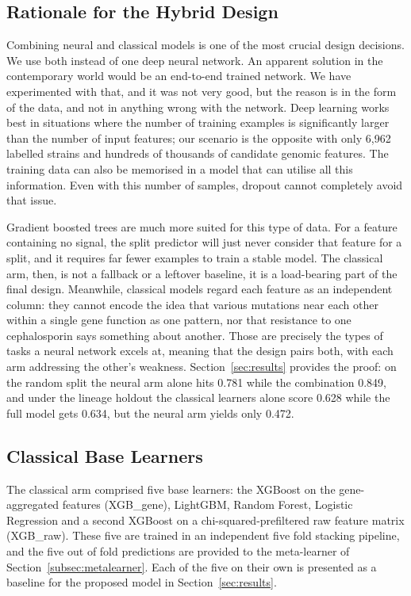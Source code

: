 \documentclass[journal]{IEEEtran}
\begin{document}
\subsection{Rationale for the Hybrid Design}
\label{subsec:hybrid}

Combining neural and classical models is one of the most crucial design decisions.
We use both instead of one deep neural network. An apparent solution in the
contemporary world would be an end-to-end trained network. We have experimented with
that, and it was not very good, but the reason is in the form of the data, and not
in anything wrong with the network. Deep learning works best in situations where the
number of training examples is significantly larger than the number of input
features; our scenario is the opposite with only 6{,}962 labelled strains and
hundreds of thousands of candidate genomic features. The training data can also be
memorised in a model that can utilise all this information. Even with this number of
samples, dropout cannot completely avoid that issue.

Gradient boosted trees are much more suited for this type of data. For a feature
containing no signal, the split predictor will just never consider that feature for
a split, and it requires far fewer examples to train a stable model. The classical
arm, then, is not a fallback or a leftover baseline, it is a load-bearing part of
the final design. Meanwhile, classical models regard each feature as an independent
column: they cannot encode the idea that various mutations near each other within a
single gene function as one pattern, nor that resistance to one cephalosporin says
something about another. Those are precisely the types of tasks a neural network
excels at, meaning that the design pairs both, with each arm addressing the other's
weakness. Section~\ref{sec:results} provides the proof: on the random split the
neural arm alone hits 0.781 while the combination 0.849, and under the lineage
holdout the classical learners alone score 0.628 while the full model gets 0.634,
but the neural arm yields only 0.472.

\subsection{Classical Base Learners}

The classical arm comprised five base learners: the XGBoost on the gene-aggregated
features (XGB\_gene), LightGBM, Random Forest, Logistic Regression and a second
XGBoost on a chi-squared-prefiltered raw feature matrix (XGB\_raw). These five are
trained in an independent five fold stacking pipeline, and the five out of fold
predictions are provided to the meta-learner of Section~\ref{subsec:metalearner}.
Each of the five on their own is presented as a baseline for the proposed model in
Section~\ref{sec:results}.
\end{document}
